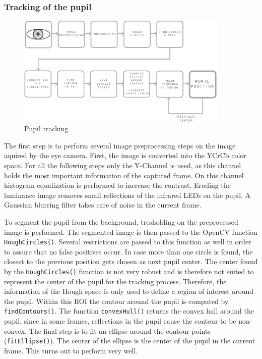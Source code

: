 \begin{itemize}
\subsubsection{Tracking of the pupil}
\begin{figure}[H]
  \centering
  \includegraphics[width=0.9\textwidth]{../finalpres/02c.pdf}
  \caption{Pupil tracking}\label{fig:pupil}
\end{figure}
The first step is to perform several image preprocessing steps on the image aquired by the eye camera. First, the image is converted into the YCrCb color space.
For all the following steps only the Y-Channel is used, as this channel holds the most important information of the captured frame.
On this channel histogram equalization is performed to increase the contrast. 
Eroding the luminance image removes small reflections of the infrared LEDs on the pupil. 
A Gaussian blurring filter takes care of noise in the current frame. 

To segment the pupil from the background, tresholding on the preprocessed image is performed. 
The segmented image is then passed to the OpenCV function \texttt{HoughCircles()}. 
Several restrictions are passed to this function as well in order to assure that no false positives occur. 
In case more than one circle is found, the closest to the previous position gets chosen as next pupil center.
The center found by the \texttt{HoughCircles()} function is not very robust and is therefore not suited to represent the center of the pupil for the tracking process.
Therefore, the information of the Hough space is only used to define a region of interest around the pupil. 
Within this ROI the contour around the pupil is computed by \texttt{findContours()}. 
The function \texttt{convexHull()} returns the convex hull around the pupil, since in some frames, reflections in the pupil cause the contour to be non-convex.
The final step is to fit an ellipse around the contour points (\texttt{fitEllipse()}).
The center of the ellipse is the center of the pupil in the current frame. 
This turns out to perform very well. 


\end{itemize}
